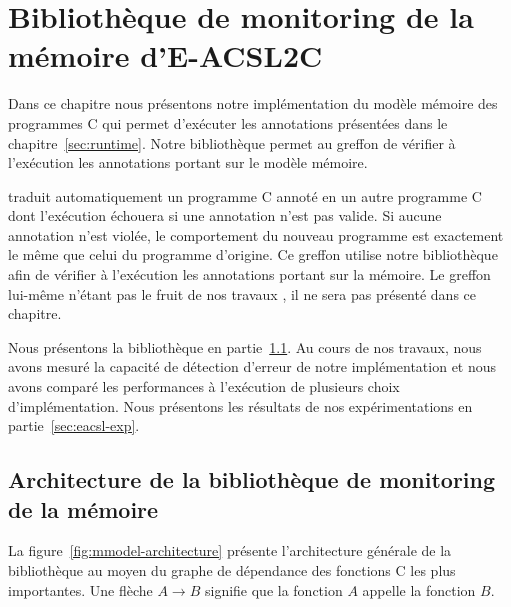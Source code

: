 
\chapter{Bibliothèque de monitoring de la mémoire d'E-ACSL2C}
\label{sec:eacsl}

\chapterintro


Dans ce chapitre nous présentons notre implémentation du modèle mémoire des
programmes C qui permet d'exécuter les annotations \eacsl présentées dans
le chapitre~\ref{sec:runtime}.
Notre bibliothèque permet au greffon \eacsltoc de vérifier à l'exécution les
annotations \eacsl portant sur le modèle mémoire.

\eacsltoc traduit automatiquement un programme C annoté en un autre
programme C dont l'exécution échouera si une annotation n'est pas valide.
Si aucune annotation n'est violée, le comportement
du nouveau programme est exactement le même que celui du programme d'origine.
Ce greffon utilise notre bibliothèque afin de vérifier à l'exécution les
annotations \eacsl portant sur la mémoire.
Le greffon \eacsltoc lui-même n'étant pas le fruit de nos travaux
\cite{Delahaye/SAC13}, il ne sera pas présenté dans ce chapitre.

Nous présentons la bibliothèque en partie~\ref{sec:eacsl-impl}.
Au cours de nos travaux, nous avons mesuré la capacité de détection d'erreur de
notre implémentation et nous avons comparé les performances à l'exécution de
plusieurs choix d'implémentation.
Nous présentons les résultats de nos expérimentations en
partie~\ref{sec:eacsl-exp}.


\section{Architecture de la bibliothèque de monitoring de la mémoire}
\label{sec:eacsl-impl}


La figure~\ref{fig:mmodel-architecture} présente l'architecture générale de la
bibliothèque au moyen du graphe de dépendance des fonctions C les plus
importantes.
Une flèche $A \rightarrow B$ signifie que la fonction $A$ appelle la fonction
$B$.

